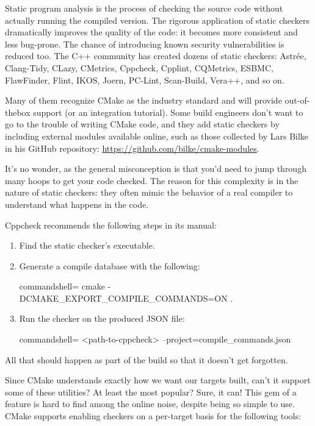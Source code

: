
Static program analysis is the process of checking the source code without actually running the compiled version. The rigorous application of static checkers dramatically improves the quality of the code: it becomes more consistent and less bug-prone. The chance of introducing known security vulnerabilities is reduced too. The C++ community has created dozens of static checkers: Astrée, Clang-Tidy, CLazy, CMetrics, Cppcheck, Cpplint, CQMetrics, ESBMC, FlawFinder, Flint, IKOS, Joern, PC-Lint, Scan-Build, Vera++, and so on.

Many of them recognize CMake as the industry standard and will provide out-of-thebox support (or an integration tutorial). Some build engineers don't want to go to the trouble of writing CMake code, and they add static checkers by including external modules available online, such as those collected by Lars Bilke in his GitHub repository: \url{https://github.com/bilke/cmake-modules}.

It's no wonder, as the general misconception is that you'd need to jump through many hoops to get your code checked. The reason for this complexity is in the nature of static checkers: they often mimic the behavior of a real compiler to understand what happens in the code.

Cppcheck recommends the following steps in its manual:

\begin{enumerate}
\item 
Find the static checker's executable.

\item 
Generate a compile database with the following:

\begin{tcblisting}{commandshell={}}
cmake -DCMAKE_EXPORT_COMPILE_COMMANDS=ON .
\end{tcblisting}

\item 
Run the checker on the produced JSON file:

\begin{tcblisting}{commandshell={}}
<path-to-cppcheck> --project=compile_commands.json
\end{tcblisting}
\end{enumerate}

All that should happen as part of the build so that it doesn't get forgotten.

Since CMake understands exactly how we want our targets built, can't it support some of these utilities? At least the most popular? Sure, it can! This gem of a feature is hard to find among the online noise, despite being so simple to use. CMake supports enabling checkers on a per-target basis for the following tools:

